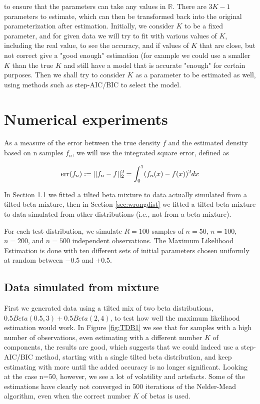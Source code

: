 \documentclass[10pt]{report}
\begin{document}
\noindent
to ensure that the parameters can take any values in $\mathbb{R}$. There are $3K-1$ parameters to estimate, which can then be transformed back into the original parameterization after estimation. Initially, we consider $K$ to be a fixed parameter, and for given data we will try to fit with various values of $K$, including the real value, to see the accuracy, and if values of $K$ that are close, but not correct give a "good enough" estimation (for example we could use a smaller $K$ than the true $K$ and still have a model that is accurate "enough" for certain purposes. Then we shall try to consider $K$ as a parameter to be estimated as well, using methods such as step-AIC/BIC to select the model.

\section{Numerical experiments}



As a measure of the error between the true density $f$ and the estimated density based on n samples $f_n$, we will use the integrated square error, defined as

$$
{\rm err}(f_n) := ||f_n - f||^2_2 = \int_0^1(f_n(x)-f(x))^2dx
$$

In Section \ref{sec:truedist} we fitted a tilted beta mixture to data actually simulated from a tilted beta mixture, then in Section \ref{sec:wrongdist} we fitted a tilted beta mixture to data simulated from other distributions (i.e., not from a beta mixture).

For each test distribution, we simulate $R=100$ samples of $n=50$, $n=100$, $n=200$, and $n=500$ independent observations. The Maximum Likelihood Estimation is done with ten different sets of initial parameters chosen uniformly at random between $-0.5$ and $+0.5$.

\subsection{Data simulated from mixture}
\label{sec:truedist}

First we generated data using a tilted mix of two beta distributions, $0.5Beta(0.5,3) + 0.5Beta(2,4)$, to test how well the maximum likelihood estimation would work. In Figure \ref{fig:TDB1} we see that for samples with a high number of observations, even estimating with a different number $K$ of components, the results are good, which suggests that we could indeed use a step-AIC/BIC method, starting with a single tilted beta distribution, and keep estimating with more until the added accuracy is no longer significant. Looking at the case n=50, however, we see a lot of volatility and artefacts. Some of the estimations have clearly not converged in 500 iterations of the Nelder-Mead algorithm, even when the correct number $K$ of betas is used.
\\
\end{document}
